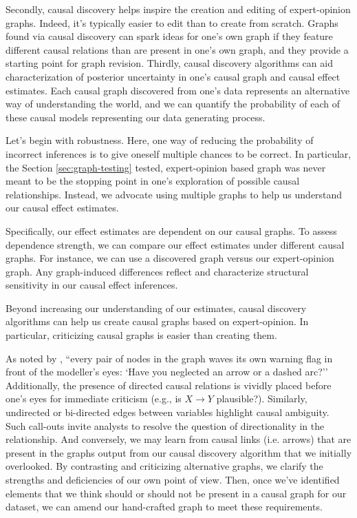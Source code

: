 Secondly, causal discovery helps inspire the creation and editing of expert-opinion graphs.
Indeed, it's typically easier to edit than to create from scratch.
Graphs found via causal discovery can spark ideas for one's own graph if they feature different causal relations than are present in one's own graph, and they provide a starting point for graph revision.
Thirdly, causal discovery algorithms can aid characterization of posterior uncertainty in one's causal graph and causal effect estimates.
Each causal graph discovered from one's data represents an alternative way of understanding the world, and we can quantify the probability of each of these causal models representing our data generating process.

Let's begin with robustness.
Here, one way of reducing the probability of incorrect inferences is to give oneself multiple chances to be correct.
In particular, the Section \ref{sec:graph-testing} tested, expert-opinion based graph was never meant to be the stopping point in one's exploration of possible causal relationships.
Instead, we advocate using multiple graphs to help us understand our causal effect estimates.

Specifically, our effect estimates are dependent on our causal graphs.
To assess dependence strength, we can compare our effect estimates under different causal graphs.
For instance, we can use a discovered graph versus our expert-opinion graph.
Any graph-induced differences reflect and characterize structural sensitivity in our causal effect inferences.

Beyond increasing our understanding of our estimates, causal discovery algorithms can help us create causal graphs based on expert-opinion.
In particular, criticizing causal graphs is easier than creating them.

As noted by \citet[p. 708]{pearl_1995_causal}, ``every pair of nodes in the graph waves its own warning flag in front of the modeller's eyes: `Have you neglected an arrow or a dashed arc?''
Additionally, the presence of directed causal relations is vividly placed before one's eyes for immediate criticism (e.g., is $X \rightarrow Y$ plausible?).
Similarly, undirected or bi-directed edges between variables highlight causal ambiguity.
Such call-outs invite analysts to resolve the question of directionality in the relationship.
And conversely, we may learn from causal links (i.e. arrows) that are present in the graphs output from our causal discovery algorithm that we initially overlooked.
By contrasting and criticizing alternative graphs, we clarify the strengths and deficiencies of our own point of view.
Then, once we've identified elements that we think should or should not be present in a causal graph for our dataset, we can amend our hand-crafted graph to meet these requirements.

